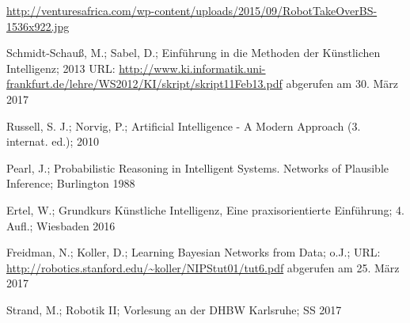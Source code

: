 \begin{thebibliography}{9999}

 \url{http://venturesafrica.com/wp-content/uploads/2015/09/RobotTakeOverBS-1536x922.jpg}

 Schmidt-Schauß, M.; Sabel, D.; Einführung in die Methoden der
Künstlichen Intelligenz; 2013 URL: \url{http://www.ki.informatik.uni-frankfurt.de/lehre/WS2012/KI/skript/skript11Feb13.pdf} abgerufen am 30. März 2017

 Russell, S. J.; Norvig, P.; Artificial Intelligence - A Modern Approach (3. internat. ed.); 2010

 Pearl, J.; Probabilistic Reasoning in Intelligent Systems. Networks of Plausible Inference;  Burlington 1988

 Ertel, W.; Grundkurs Künstliche Intelligenz, Eine praxisorientierte Einführung; 4. Aufl.; Wiesbaden 2016

 Freidman, N.; Koller, D.; Learning Bayesian Networks from Data; o.J.; URL: \url{http://robotics.stanford.edu/~koller/NIPStut01/tut6.pdf} abgerufen am 25. März 2017

 Strand, M.; Robotik II; Vorlesung an der DHBW Karlsruhe; SS 2017

\end{thebibliography}
